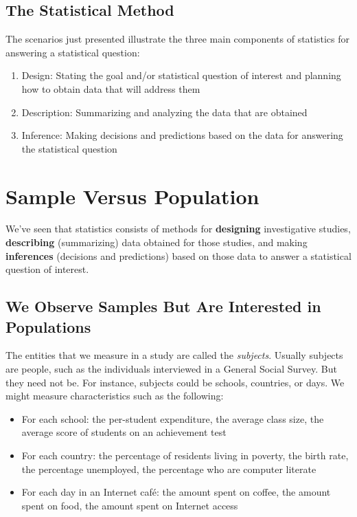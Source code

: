 \subsection{The Statistical Method}

The scenarios just presented illustrate the three main components of statistics
for answering a statistical question:

\begin{enumerate}
    \item Design: Stating the goal and/or statistical question of interest and planning
how to obtain data that will address them
\item Description: Summarizing and analyzing the data that are obtained
\item Inference: Making decisions and predictions based on the data for answering
the statistical question
\end{enumerate}

\section{Sample Versus Population}

We’ve seen that statistics consists of methods for \textbf{designing} investigative studies, \textbf{describing} (summarizing) data obtained for those studies, and making \textbf{inferences} (decisions and predictions) based on those data to answer a statistical question of interest.

\subsection{We Observe Samples But Are Interested in Populations}

The entities that we measure in a study are called the \textit{subjects}. Usually subjects are people, such as the individuals interviewed in a General Social Survey. But they need not be. For instance, subjects could be schools, countries, or days. We might measure characteristics such as the following:
\begin{itemize}
    \item For each school: the per-student expenditure, the average class size, the average score of students on an achievement test
    \item For each country: the percentage of residents living in poverty, the birth rate, the percentage unemployed, the percentage who are computer literate
    \item For each day in an Internet café: the amount spent on coffee, the amount spent on food, the amount spent on Internet access
\end{itemize}


